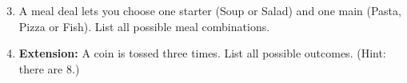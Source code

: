 \documentclass[11pt]{article}
\newcommand{\ans}{\hrulefill}
\newcommand{\anshere}{\par\vspace{0.3em}\noindent\ans\par\vspace{0.3em}}
\begin{document}
\vspace{0.3em}
\begin{enumerate}[label=(\alph*)]
\setcounter{enumi}{2}
  \item A meal deal lets you choose one starter (Soup or Salad) and one main (Pasta, Pizza or
    Fish). List all possible meal combinations.
  \anshere
  \item \textbf{Extension:} A coin is tossed three times. List all possible outcomes. (Hint:
    there are $8$.)
  \anshere
\end{enumerate}
\end{document}
